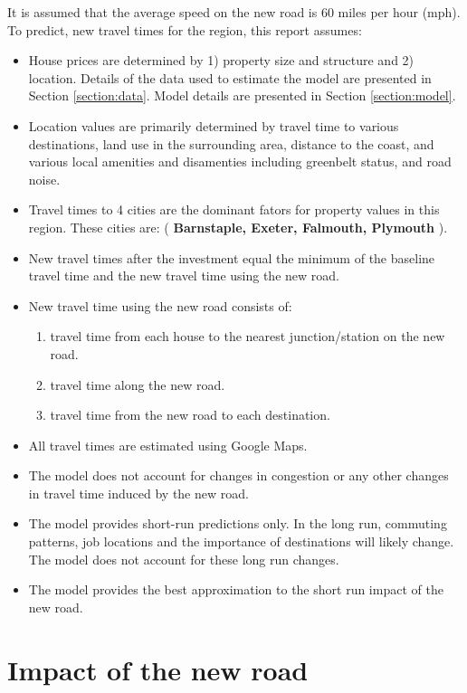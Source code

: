 \documentclass{article}\usepackage[]{graphicx}\usepackage[]{color}
\begin{document}
It is assumed that the average speed on the new road is 60 miles per hour (mph).
To predict, new travel times for the region, this report assumes:
\begin{itemize}
\item House prices are determined by 1) property size and structure and 2) location. Details of the data used to estimate the model are presented in Section \ref{section:data}. Model details are presented in Section \ref{section:model}.
\item Location values are primarily determined by travel time to various destinations, land use in the surrounding area, distance to the coast, and various local amenities and disamenties including greenbelt status, and road noise.  
\item Travel times to 4 cities are the dominant fators for property values in this region. These cities are: (\textbf{ Barnstaple, Exeter, Falmouth, Plymouth} ).
\item New travel times after the investment equal the minimum of the baseline travel time and the new travel time using the new road. 
\item New travel time using the new road consists of:
\begin{enumerate}
\item travel time from each house to the nearest junction/station on the new road.
\item travel time along the new road.
\item travel time from the new road to each destination.
\end{enumerate}
\item All travel times are estimated using Google Maps.
\item The model does not account for changes in congestion or any other changes in travel time induced by the new road.
\item The model provides short-run predictions only. In the long run, commuting patterns, job locations and the importance of destinations will likely change. The model does not account for these long run changes.
\item The model provides the best approximation to the short run impact of the new road.
\end{itemize}

\section{Impact of the new road}
\end{document}
